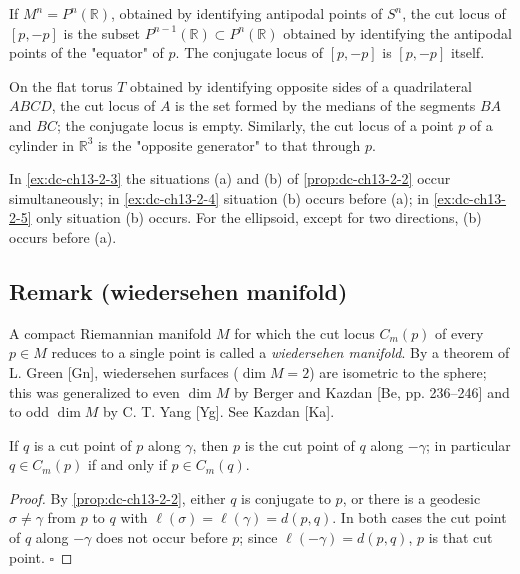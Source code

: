\begin{example}
  \label{ex:dc-ch13-2-4}
  If $M^n=P^n(\mathbb{R})$, obtained by identifying antipodal points of $S^n$, the
  cut locus of $[p,-p]$ is the subset $P^{n-1}(\mathbb{R})\subset P^n(\mathbb{R})$
  obtained by identifying the antipodal points of the "equator" of $p$. The conjugate
  locus of $[p,-p]$ is $[p,-p]$ itself.
\end{example}

\begin{example}
  \label{ex:dc-ch13-2-5}
  On the flat torus $T$ obtained by identifying opposite sides of a quadrilateral
  $ABCD$, the cut locus of $A$ is the set formed by the medians of the segments $BA$
  and $BC$; the conjugate locus is empty. Similarly, the cut locus of a point $p$ of
  a cylinder in $\mathbb{R}^3$ is the "opposite generator" to that through $p$.
\end{example}

\begin{remark}[Remark 2.6]
  \label{rem:dc-ch13-2-6}
  In \cref{ex:dc-ch13-2-3} the situations (a) and (b) of \cref{prop:dc-ch13-2-2} occur simultaneously;
  in \cref{ex:dc-ch13-2-4} situation (b) occurs before (a); in \cref{ex:dc-ch13-2-5} only situation (b)
  occurs. For the ellipsoid, except for two directions, (b) occurs before (a).
\end{remark}

\subsection{Remark (wiedersehen manifold)}
A compact Riemannian manifold $M$ for which the cut locus $C_m(p)$ of every
$p\in M$ reduces to a single point is called a \emph{wiedersehen manifold}. By a theorem
of L. Green [Gn], wiedersehen surfaces ($\dim M=2$) are isometric to the sphere;
this was generalized to even $\dim M$ by Berger and Kazdan [Be, pp. 236–246] and to
odd $\dim M$ by C. T. Yang [Yg]. See Kazdan [Ka].

\begin{corollary}
  \label{cor:dc-ch13-2-7}
  If $q$ is a cut point of $p$ along $\gamma$, then $p$ is the cut point of $q$ along
  $-\gamma$; in particular $q\in C_m(p)$ if and only if $p\in C_m(q)$.
\end{corollary}
\begin{proof}
  By \cref{prop:dc-ch13-2-2}, either $q$ is conjugate to $p$, or there is a geodesic
  $\sigma\neq\gamma$ from $p$ to $q$ with $\ell(\sigma)=\ell(\gamma)=d(p,q)$. In both
  cases the cut point of $q$ along $-\gamma$ does not occur before $p$; since
  $\ell(-\gamma)=d(p,q)$, $p$ is that cut point. $\square$
\end{proof}

